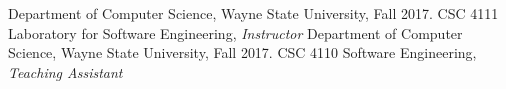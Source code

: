 \begin{cventries}
  \cventry
    {Department of Computer Science, Wayne State University, Fall 2017.} %
    {CSC 4111 Laboratory for Software Engineering, \textit{Instructor}} %
    {} %
    {} %
    {}
    \vspace{-5pt}
   \cventry
    {Department of Computer Science, Wayne State University, Fall 2017.} %
    {CSC 4110 Software Engineering, \textit{Teaching Assistant}} %
    {} %
    {} %
    {}
\end{cventries}